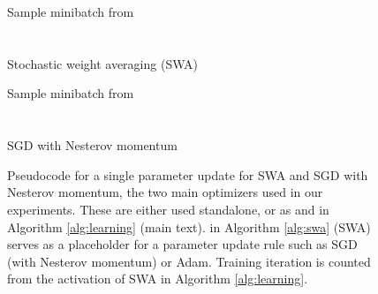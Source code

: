 \documentclass{article} \usepackage{iclr2021_conference,times}
\begin{document}
\begin{figure}[h!]
\centering
\begin{minipage}{0.46\textwidth}
\begin{algorithm}[H]    
   Sample minibatch from \\
 \\
 
 
 \\
   
  \caption{Stochastic weight averaging (SWA)\label{alg:swa}}
 \end{algorithm}
 \hspace{0.5cm}
\end{minipage}
\begin{minipage}{0.46\textwidth}
\hspace{0.3cm}
\begin{algorithm}[H]    
   Sample minibatch from \\
 \\
 \\
   
  \caption{SGD with Nesterov momentum\label{alg:nesterov}}
 \end{algorithm}
\end{minipage}
  \caption{Pseudocode for a single parameter update for SWA and SGD with Nesterov momentum, the two main optimizers used in our experiments. These are either used standalone, or as  and  in Algorithm \ref{alg:learning} (main text).  in Algorithm \ref{alg:swa} (SWA) serves as a placeholder for a parameter update rule such as SGD (with Nesterov momentum) or Adam. Training iteration  is counted from the activation of SWA in Algorithm \ref{alg:learning}.}
\end{figure}
\end{document}
